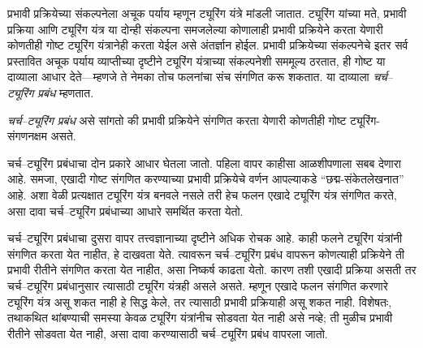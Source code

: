 \documentclass[../../../include/open-logic-section]{subfiles}
\begin{document}

प्रभावी प्रक्रियेच्या संकल्पनेला अचूक पर्याय म्हणून ट्यूरिंग
यंत्रे मांडली जातात. ट्यूरिंग यांच्या मते, प्रभावी प्रक्रिया आणि
ट्यूरिंग यंत्र या दोन्ही संकल्पना समजलेल्या कोणालाही प्रभावी
प्रक्रियेने करता येणारी कोणतीही गोष्ट ट्यूरिंग यंत्रानेही करता
येईल असे अंतर्ज्ञान होईल. प्रभावी प्रक्रियेच्या संकल्पनेचे
इतर सर्व प्रस्तावित अचूक पर्याय व्याप्तीच्या दृष्टीने ट्यूरिंग
यंत्राच्या संकल्पनेशी सममूल्य ठरतात, ही गोष्ट या दाव्याला
आधार देते---म्हणजे ते नेमका तोच फलनांचा संच संगणित करू
शकतात. या दाव्याला \emph{चर्च--ट्यूरिंग प्रबंध} म्हणतात.

\begin{defn}[चर्च--ट्यूरिंग प्रबंध]
\emph{चर्च--ट्यूरिंग प्रबंध} असे सांगतो की प्रभावी प्रक्रियेने
संगणित करता येणारी कोणतीही गोष्ट ट्यूरिंग-संगणनक्षम असते.
\end{defn}

चर्च--ट्यूरिंग प्रबंधाचा दोन प्रकारे आधार घेतला जातो. पहिला
वापर काहीसा आळशीपणाला सबब देणारा आहे. समजा, एखादी गोष्ट
संगणित करण्याच्या प्रभावी प्रक्रियेचे वर्णन आपल्याकडे
``छद्म-संकेतलेखनात'' आहे. अशा वेळी प्रत्यक्षात ट्यूरिंग यंत्र
बनवले नसले तरी हेच फलन एखादे ट्यूरिंग यंत्र संगणित करते,
असा दावा चर्च--ट्यूरिंग प्रबंधाच्या आधारे समर्थित करता येतो.

चर्च--ट्यूरिंग प्रबंधाचा दुसरा वापर तत्त्वज्ञानाच्या दृष्टीने
अधिक रोचक आहे. काही फलने ट्यूरिंग यंत्रांनी संगणित करता
येत नाहीत, हे दाखवता येते. त्यावरून चर्च--ट्यूरिंग प्रबंध
वापरून कोणत्याही प्रक्रियेने ती प्रभावी रीतीने संगणित करता
येत नाहीत, असा निष्कर्ष काढता येतो. कारण तशी एखादी प्रक्रिया
असती तर चर्च--ट्यूरिंग प्रबंधानुसार त्यासाठी ट्यूरिंग यंत्रही
असले असते. म्हणून एखादे फलन संगणित करणारे ट्यूरिंग यंत्र
असू शकत नाही हे सिद्ध केले, तर त्यासाठी प्रभावी प्रक्रियाही
असू शकत नाही. विशेषतः, तथाकथित थांबण्याची समस्या केवळ
ट्यूरिंग यंत्रांनीच सोडवता येत नाही असे नव्हे; ती मुळीच
प्रभावी रीतीने सोडवता येत नाही, असा दावा करण्यासाठी
चर्च--ट्यूरिंग प्रबंध वापरला जातो.
\end{document}
